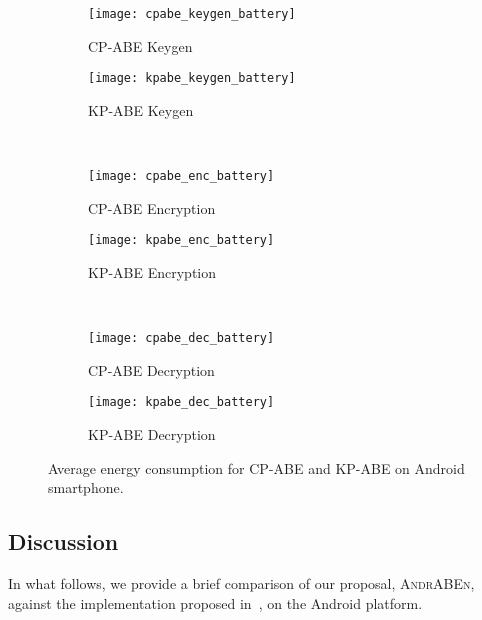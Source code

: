 \documentclass{sig-alternate-2013}
\newcommand{\andraben}{\textsc{AndrABEn}}
\begin{document}
\begin{figure}[h!]
	\centering
	\begin{subfigure}[b]{0.49\columnwidth}
		\centering
		\texttt{[image: cpabe\_keygen\_battery]}
		\caption{CP-ABE Keygen}
		\label{cpabe_keygen_android_battery}
	\end{subfigure}
	\begin{subfigure}[b]{0.49\columnwidth}
		\centering
		\texttt{[image: kpabe\_keygen\_battery]}
		\caption{KP-ABE Keygen}
		\label{kpabe_keygen_android_battery}
	\end{subfigure}
	\\
	\begin{subfigure}[b]{0.49\columnwidth}
		\centering
		\texttt{[image: cpabe\_enc\_battery]}
		\caption{CP-ABE Encryption}
		\label{cpabe_enc_android}
	\end{subfigure}
	\begin{subfigure}[b]{0.49\columnwidth}
		\centering
		\texttt{[image: kpabe\_enc\_battery]}
		\caption{KP-ABE Encryption}
		\label{kpabe_enc_android_battery}
	\end{subfigure}
	\\
	\begin{subfigure}[b]{0.49\columnwidth}
		\centering
		\texttt{[image: cpabe\_dec\_battery]}
		\caption{CP-ABE Decryption}
		\label{cpabe_dec_android}
	\end{subfigure}
	\begin{subfigure}[b]{0.49\columnwidth}
		\centering
		\texttt{[image: kpabe\_dec\_battery]}
		\caption{KP-ABE Decryption}
		\label{kpabe_dec_android_energy}
	\end{subfigure}
	\caption{Average energy consumption for CP-ABE and KP-ABE on Android smartphone.}
	\label{fig:android_battery}
\end{figure}

\subsection{Discussion}\label{sec:discussion}


In what follows, we provide a brief comparison of our proposal, \andraben, against the implementation proposed in~\cite{ABE_icc_2014}, on the Android platform. 
\end{document}
